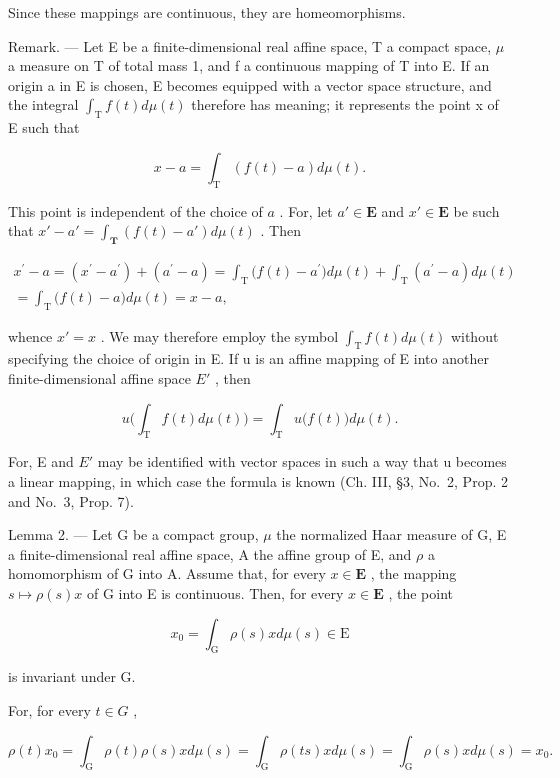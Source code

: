 Since these mappings are continuous, they are homeomorphisms.

Remark. --- Let E be a finite-dimensional real affine space, T a compact space, \(\mu\) a measure on T of total mass 1, and f a continuous mapping of T into E. If an origin a in E is chosen, E becomes equipped with a vector space structure, and the integral \(\int_{\mathrm{T}} f(t) d\mu(t)\) therefore has meaning; it represents the point x of E such that

\[
x - a = \int_ {\mathrm{T}} (f (t) - a) d \mu (t).
\]

This point is independent of the choice of \(a\) . For, let \(a' \in \mathbf{E}\) and \(x' \in \mathbf{E}\) be such that \(x' - a' = \int_{\mathbf{T}} (f(t) - a') d\mu(t)\) . Then

\[
\begin{array}{c} x ^ {\prime} - a = (x ^ {\prime} - a ^ {\prime}) + (a ^ {\prime} - a) = \int_ {\mathrm{T}} \bigl (f (t) - a ^ {\prime} \bigr) d \mu (t) + \int_ {\mathrm{T}} (a ^ {\prime} - a) d \mu (t) \\ = \int_ {\mathrm{T}} \bigl (f (t) - a \bigr) d \mu (t) = x - a, \end{array}
\]

whence \(x' = x\) . We may therefore employ the symbol \(\int_{\mathrm{T}} f(t) d\mu(t)\) without specifying the choice of origin in E. If u is an affine mapping of E into another finite-dimensional affine space \(E'\) , then

\[
u \Big (\int_ {\mathrm{T}} f (t) d \mu (t) \Big) = \int_ {\mathrm{T}} u \big (f (t) \big) d \mu (t).
\]

For, E and \(E'\) may be identified with vector spaces in such a way that u becomes a linear mapping, in which case the formula is known (Ch. III, §3, No.~2, Prop. 2 and No.~3, Prop. 7).

Lemma 2. --- Let G be a compact group, \(\mu\) the normalized Haar measure of G, E a finite-dimensional real affine space, A the affine group of E, and \(\rho\) a homomorphism of G into A. Assume that, for every \(x \in \mathbf{E}\) , the mapping \(s \mapsto \rho(s)x\) of G into E is continuous. Then, for every \(x \in \mathbf{E}\) , the point

\[
x _ {0} = \int_ {\mathrm{G}} \rho (s) x d \mu (s) \in \mathrm{E}
\]

is invariant under G.

For, for every \(t \in G\) ,

\[
\rho (t) x _ {0} = \int_ {\mathrm{G}} \rho (t) \rho (s) x d \mu (s) = \int_ {\mathrm{G}} \rho (t s) x d \mu (s) = \int_ {\mathrm{G}} \rho (s) x d \mu (s) = x _ {0}.
\]

